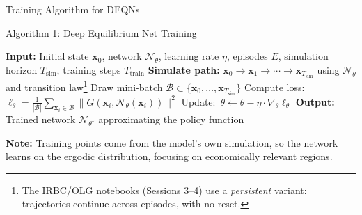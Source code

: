 \documentclass[aspectratio=169,11pt]{beamer}
\newcommand{\emphc}[1]{\textcolor{harvardcrimson}{#1}}
\newcommand{\x}{\bm{x}}
\begin{document}
\begin{frame}{Training Algorithm for DEQNs}
\begin{block}{Algorithm 1: Deep Equilibrium Net Training}
\begin{algorithmic}
\footnotesize
\STATE \textbf{Input:} Initial state $\x_0$, network $\mathcal{N}_\theta$, learning rate $\eta$, episodes $E$, simulation horizon $T_{\mathrm{sim}}$, training steps $T_{\mathrm{train}}$
    \STATE \textbf{Simulate path:} $\x_0 \to \x_1 \to \cdots \to \x_{T_{\mathrm{sim}}}$ using $\mathcal{N}_\theta$ and transition law\footnote{The IRBC/OLG notebooks (Sessions 3--4) use a \emph{persistent} variant: trajectories continue across episodes, with no reset.}
        \STATE Draw mini-batch $\mathcal{B} \subset \{\x_0, \ldots, \x_{T_{\mathrm{sim}}}\}$
        \STATE Compute loss:~$\ell_\theta = \frac{1}{|\mathcal{B}|}\sum_{\x_i \in \mathcal{B}} \|G(\x_i, \mathcal{N}_\theta(\x_i))\|^2$
        \STATE Update:~$\theta \leftarrow \theta - \eta \cdot \nabla_\theta \ell_\theta$
    \ENDFOR
\ENDFOR
\STATE \textbf{Output:} Trained network $\mathcal{N}_{\theta^\star}$ approximating the policy function
\end{algorithmic}
\end{block}

\vspace{0.2em}
{\small \textbf{Note:} Training points come from the \emphc{model's own simulation}, so the network learns on the ergodic distribution, focusing on economically relevant regions.}
\end{frame}
\end{document}
